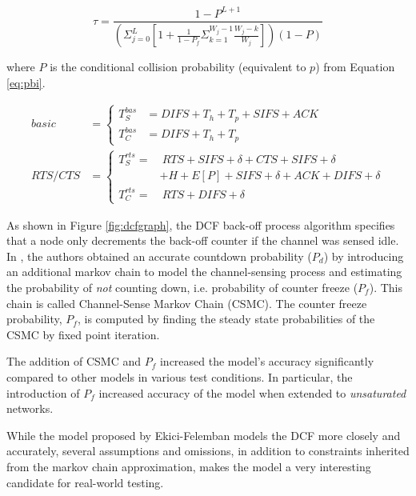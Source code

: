 \begin{equation} \label{eq:xfe}
	\tau = \frac{1-P^{L+1}}{
		(\Sigma^L_{j=0}
			[1 + \frac{1}{1-P_f}
				\Sigma^{W_j-1}_{k=1} \frac{W_j-k}{W_j}
			]
		)(1-P)}
\end{equation}

where $P$ is the conditional collision probability (equivalent to $p$) from
Equation \ref{eq:pbi}.

\begin{align}  \label{eq:tfe}
	\mathit{basic} & = \left\{
	    \begin{aligned}
	        T^{bas}_{S} & = \mathit{DIFS} + T_h + T_p + \mathit{SIFS} + \mathit{ACK}  \\
	        T^{bas}_{C} & = \mathit{DIFS} + T_h + T_p
	    \end{aligned}
	\right. \\
	\mathit{RTS/CTS} & = \left\{
	    \begin{aligned}
	        T^{rts}_{S} = & ~ \mathit{RTS} + \mathit{SIFS} + \delta + \mathit{CTS} + \mathit{SIFS} + \delta \\ & + H + E[P] + \mathit{SIFS} + \delta + \mathit{ACK} + \mathit{DIFS} + \delta  \\
	        T^{rts}_{C} = & ~ \mathit{RTS} + \mathit{DIFS} + \delta
	    \end{aligned}
	\right.
\end{align}

As shown in Figure \ref{fig:dcfgraph}, the DCF back-off process algorithm
specifies that a node only decrements the back-off counter if the channel was
sensed idle. In \cite{felemban}, the authors obtained an accurate countdown
probability ($P_d$) by introducing an additional markov chain to model the
channel-sensing process and estimating the probability of \emph{not} counting
down, i.e. probability of counter freeze ($P_f$). This chain is called
Channel-Sense Markov Chain (CSMC). The counter freeze probability, $P_f$, is
computed by finding the steady state probabilities of the CSMC by fixed point
iteration.

The addition of CSMC and $P_f$ increased the model's accuracy significantly
compared to other models in various test conditions. In particular, the
introduction of $P_f$ increased accuracy of the model when extended to
\emph{unsaturated} networks.

While the model proposed by Ekici-Felemban models the DCF more closely and
accurately, several assumptions and omissions, in addition to constraints
inherited from the markov chain approximation, makes the model a very
interesting candidate for real-world testing. 

